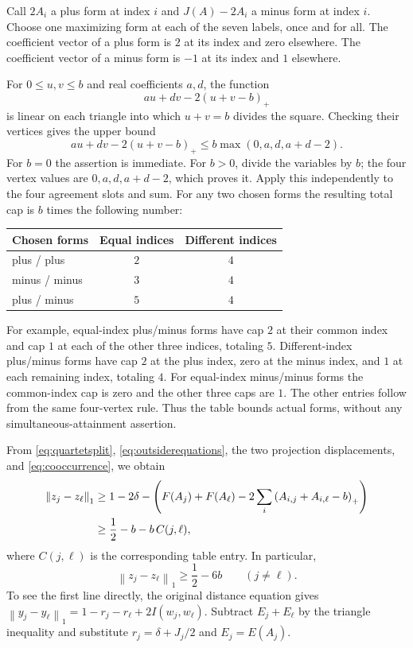 \documentclass[11pt]{article}
\theoremstyle{definition}
\theoremstyle{remark}
\newcommand{\norm}[1]{\left\lVert#1\right\rVert_1}
\newcommand{\pos}[1]{\left(#1\right)_+}
\begin{document}
Call $2A_i$ a plus form at index $i$ and $J(A)-2A_i$ a minus form at
index $i$. Choose one maximizing form at each of the seven labels,
once and for all. The coefficient vector of a plus form is $2$ at its
index and zero elsewhere. The coefficient vector of a minus form is
$-1$ at its index and $1$ elsewhere.

For $0\leq u,v\leq b$ and real coefficients $a,d$, the function
\[
 au+dv-2\pos{u+v-b}
\]
is linear on each triangle into which $u+v=b$ divides the square.
Checking their vertices gives the upper bound
\begin{equation}\label{eq:slotcap}
 au+dv-2\pos{u+v-b}
   \leq b\max(0,a,d,a+d-2).
\end{equation}
For $b=0$ the assertion is immediate. For $b>0$, divide the variables
by $b$; the four vertex values are $0,a,d,a+d-2$, which proves it.
Apply this independently to the four agreement slots and sum. For any
two chosen forms the resulting total cap is $b$ times the following
number:
\begin{center}
\begin{tabular}{lcc}
\toprule
Chosen forms & Equal indices & Different indices\\
\midrule
plus / plus & $2$ & $4$\\
minus / minus & $3$ & $4$\\
plus / minus & $5$ & $4$\\
\bottomrule
\end{tabular}
\end{center}
For example, equal-index plus/minus forms have cap $2$ at their common
index and cap $1$ at each of the other three indices, totaling $5$.
Different-index plus/minus forms have cap $2$ at the plus index, zero
at the minus index, and $1$ at each remaining index, totaling $4$.
For equal-index minus/minus forms the common-index cap is zero and
the other three caps are $1$. The other entries follow from the same
four-vertex rule. Thus the table bounds actual forms, without any
simultaneous-attainment assertion.

From \eqref{eq:quartetsplit}, \eqref{eq:outsiderequations}, the two
projection displacements, and \eqref{eq:cooccurrence}, we obtain
\begin{align}\label{eq:pairprojected}
 \norm{z_j-z_\ell}
 &\geq1-2\delta-
 \left(F(A_j)+F(A_\ell)
       -2\sum_i\pos{A_{i,j}+A_{i,\ell}-b}\right)\notag\\
 &\geq\frac12-b-b\,C(j,\ell),
\end{align}
where $C(j,\ell)$ is the corresponding table entry. In particular,
\begin{equation}\label{eq:pairseparation}
 \norm{z_j-z_\ell}\geq\frac12-6b\qquad(j\ne\ell).
\end{equation}
To see the first line directly, the original distance equation gives
$\norm{y_j-y_\ell}=1-r_j-r_\ell+2I(w_j,w_\ell)$.
Subtract $E_j+E_\ell$ by the triangle inequality and substitute
$r_j=\delta+J_j/2$ and $E_j=E(A_j)$.
\end{document}
